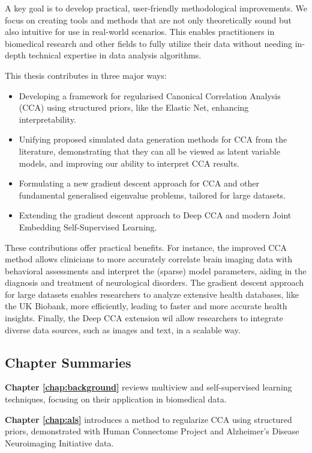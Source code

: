 A key goal is to develop practical, user-friendly methodological improvements. We focus on creating tools and methods that are not only theoretically sound but also intuitive for use in real-world scenarios. This enables practitioners in biomedical research and other fields to fully utilize their data without needing in-depth technical expertise in data analysis algorithms.

This thesis contributes in three major ways:

\begin{itemize}
    \item Developing a framework for regularised Canonical Correlation Analysis (CCA) using structured priors, like the Elastic Net, enhancing interpretability.
    \item Unifying proposed simulated data generation methods for CCA from the literature, demonstrating that they can all be viewed as latent variable models, and improving our ability to interpret CCA results.
    \item Formulating a new gradient descent approach for CCA and other fundamental generalised eigenvalue problems, tailored for large datasets.
    \item Extending the gradient descent approach to Deep CCA and modern Joint Embedding Self-Supervised Learning.
\end{itemize}

These contributions offer practical benefits. For instance, the improved CCA method allows clinicians to more accurately correlate brain imaging data with behavioral assessments and interpret the (sparse) model parameters, aiding in the diagnosis and treatment of neurological disorders. The gradient descent approach for large datasets enables researchers to analyze extensive health databases, like the UK Biobank, more efficiently, leading to faster and more accurate health insights. Finally, the Deep CCA extension wil allow researchers to integrate diverse data sources, such as images and text, in a scalable way.

\subsection{Chapter Summaries}

\textbf{Chapter \ref{chap:background}} reviews multiview and self-supervised learning techniques, focusing on their application in biomedical data.

\textbf{Chapter \ref{chap:als}} introduces a method to regularize CCA using structured priors, demonstrated with Human Connectome Project and Alzheimer's Disease Neuroimaging Initiative data.

